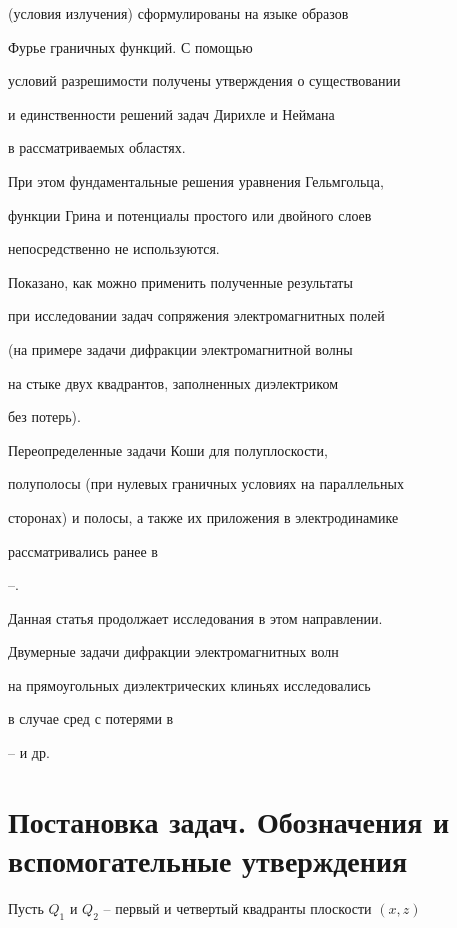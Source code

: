 (условия излучения) сформулированы на языке образов


Фурье граничных функций. С помощью


условий разрешимости получены утверждения о существовании


и единственности решений задач Дирихле и Неймана


в рассматриваемых областях.


При этом фундаментальные решения уравнения Гельмгольца,


функции Грина и потенциалы простого или двойного слоев


непосредственно не используются.


Показано, как можно применить полученные результаты


при исследовании задач сопряжения электромагнитных полей


(на примере задачи дифракции электромагнитной волны


на стыке двух квадрантов, заполненных диэлектриком


без потерь).





Переопределенные задачи Коши для полуплоскости,


полуполосы (при нулевых граничных условиях на параллельных


сторонах) и полосы, а также их приложения в электродинамике


рассматривались ранее в 


\cite{MMET}--\cite{Layers}.


Данная статья продолжает исследования в этом направлении.


Двумерные задачи дифракции электромагнитных волн


на прямоугольных диэлектрических клиньях исследовались


в случае сред с потерями в 


\cite{MeiLat}--\cite{AlKh} и др.








\section{Постановка задач. Обозначения и вспомогательные утверждения}





Пусть $Q_1$ и $Q_2$ -- первый и четвертый квадранты плоскости $(x,z)$


